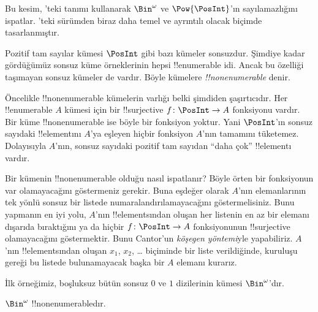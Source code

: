 \documentclass[../../../include/open-logic-section]{subfiles}
\begin{document}


\begin{editorial}
  Bu kesim, 'teki tanımı kullanarak $\Bin^\omega$ ve
  $\Pow{\PosInt}$'ın sayılamazlığını ispatlar. 'teki
  sürümden biraz daha temel ve ayrıntılı olacak biçimde tasarlanmıştır.
\end{editorial}

Pozitif tam sayılar kümesi $\PosInt$ gibi bazı kümeler sonsuzdur. Şimdiye
kadar gördüğümüz sonsuz küme örneklerinin hepsi !!{enumerable} idi. Ancak bu
özelliği taşımayan sonsuz kümeler de vardır. Böyle kümelere
\emph{!!{nonenumerable}} denir.

Öncelikle !!{nonenumerable} kümelerin varlığı belki şimdiden şaşırtıcıdır.
Her !!{enumerable} $A$ kümesi için bir !!{surjective} $f\colon\PosInt\to A$
fonksiyonu vardır. Bir küme !!{nonenumerable} ise böyle bir fonksiyon yoktur.
Yani $\PosInt$'ın sonsuz sayıdaki !!{element}{}ını $A$'ya eşleyen hiçbir
fonksiyon $A$'nın tamamını tüketemez. Dolayısıyla $A$'nın, sonsuz sayıdaki
pozitif tam sayıdan ``daha çok'' !!{element}{}ı vardır.

Bir kümenin !!{nonenumerable} olduğu nasıl ispatlanır? Böyle örten bir
fonksiyonun var olamayacağını göstermeniz gerekir. Buna eşdeğer olarak
$A$'nın elemanlarının tek yönlü sonsuz bir listede numaralandırılamayacağını
göstermelisiniz. Bunu yapmanın en iyi yolu, $A$'nın !!{element}s{}ından oluşan
her listenin en az bir elemanı dışarıda bıraktığını ya da hiçbir
$f\colon\PosInt\to A$ fonksiyonunun !!{surjective} olamayacağını
göstermektir. Bunu Cantor'un \emph{köşegen yöntemi}yle yapabiliriz. $A$'nın
!!{element}s{}ından oluşan $x_1$, $x_2$, \dots{} biçiminde bir liste verildiğinde,
kuruluşu gereği bu listede bulunamayacak başka bir $A$ elemanı kurarız.

İlk örneğimiz, boşluksuz bütün sonsuz $0$ ve $1$ dizilerinin kümesi
$\Bin^\omega$'dır.

\begin{thm}
$\Bin^\omega$ !!{nonenumerable}{}dır.
\end{thm}
\end{document}
